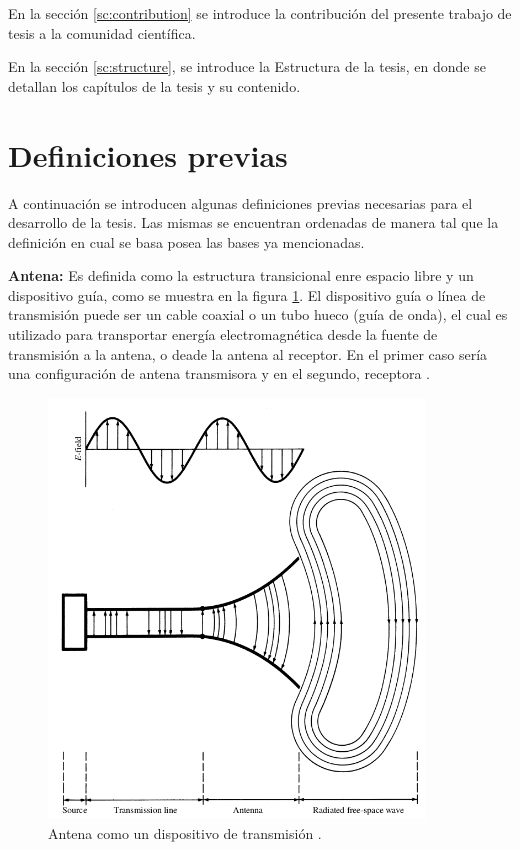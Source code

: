 En la sección \ref{sc:contribution} se introduce la contribución del presente trabajo de tesis a la comunidad científica.

En la sección \ref{sc:structure}, se introduce la Estructura de la tesis, en donde se detallan los capítulos de la tesis y su
contenido.


\section{Definiciones previas} \label{sc:definitions}

A continuación se introducen algunas definiciones previas necesarias para el desarrollo de la tesis. Las mismas se encuentran ordenadas de manera tal que la definición en cual se basa posea las bases ya mencionadas.

{\textbf{Antena:}} Es definida como la estructura transicional enre espacio libre y un dispositivo guía, como se muestra en la 
figura \ref{fig:antenna}. El dispositivo guía o línea de transmisión puede ser un cable coaxial o un tubo hueco (guía de 
onda), el cual es utilizado para transportar energía electromagnética desde la fuente de transmisión a la antena, o deade la 
antena al receptor. En el primer caso sería una configuración de antena transmisora y en el segundo, receptora \cite{Balanis2012}.
\begin{figure}[H]
 \centering
 \includegraphics[width=10cm]{gfx/antenna.png}
 \caption{Antena como un dispositivo de transmisión \cite{Balanis2012}.}
 \label{fig:antenna}
\end{figure}

